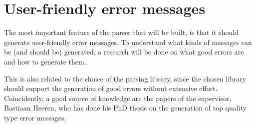 
\section{User-friendly error messages}
The most important feature of the parser that will be built, is that it should generate user-friendly error messages.
To understand what kinds of messages can be (and should be) generated, a research will be done on what good errors are and how to generate them.

This is also related to the choice of the parsing library, since the chosen library should support the generation of good errors without extensive effort.
Coincidently, a good source of knowledge are the papers of the supervisor, Bastiaan Heeren, who has done his PhD thesis on the generation of top quality type error messages\cite{heeren-error}.
